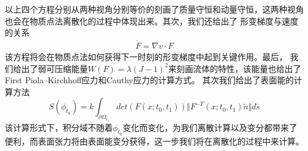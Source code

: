 以上四个方程分别从两种视角分别等价的刻画了质量守恒和动量守恒，这两种视角也会在物质点法离散化的过程中体现出来。其次，我们还给出了
形变梯度与速度的关系
\begin{align*}
    \dot{F} = \nabla v \cdot F
\end{align*}
该方程将会在物质点法如何获得下一时刻的形变梯度中起到关键作用。最后，
我们给出了弱可压缩能量$W(F)=\lambda (J-1)^2$来刻画流体的特性，该能量也给出了First Piola–Kirchhoff应力和Cauthy应力的计算方式。
其次我们给出了表面能的计算方法
$$S(\phi_{t_0}) = k \int_{\partial \Omega_{t_1}} det(F(x;t_0,t_1)) \Vert F^{-T}(x;t_0,t_1)\tilde{n}\Vert d\tilde{s}$$
该计算形式下，积分域不随着$\phi_{t_0}$变化而变化，为我们离散计算以及变分都带来了便利，而表面张力将由表面能变分获得，这一步我们将在离散化的过程中来计算。







